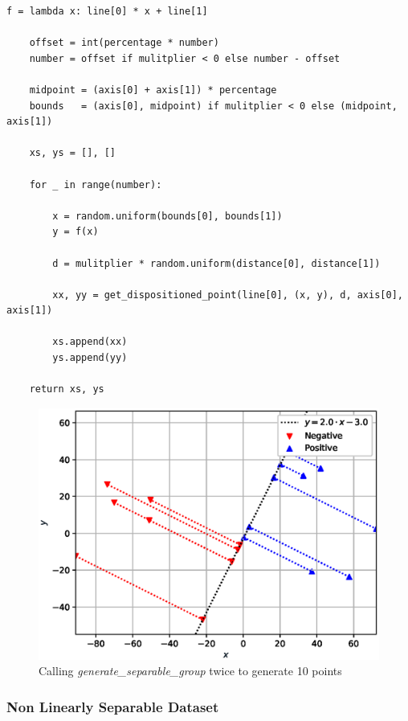 \documentclass[12pt]{article}
\newenvironment{matlab}
	{\begin{figure}[H]\centering\captionsetup{justification=centering}}
	{\end{figure}}
\begin{document}
\begin{lstlisting}[caption={Η μέθοδος \textit{generate\_separable\_group}}]
    f = lambda x: line[0] * x + line[1]

    offset = int(percentage * number)
    number = offset if mulitplier < 0 else number - offset

    midpoint = (axis[0] + axis[1]) * percentage
    bounds   = (axis[0], midpoint) if mulitplier < 0 else (midpoint, axis[1])

    xs, ys = [], []

    for _ in range(number):

        x = random.uniform(bounds[0], bounds[1])
        y = f(x)

        d = mulitplier * random.uniform(distance[0], distance[1])

        xx, yy = get_dispositioned_point(line[0], (x, y), d, axis[0], axis[1])

        xs.append(xx)
        ys.append(yy)

    return xs, ys
\end{lstlisting}

\begin{matlab}
    \includegraphics[scale=0.75]{figures/perpendicular}
    \caption{Calling \textit{generate\_separable\_group} twice to generate 10 points }
\end{matlab}

\subsubsection{Non Linearly Separable Dataset}
\end{document}

